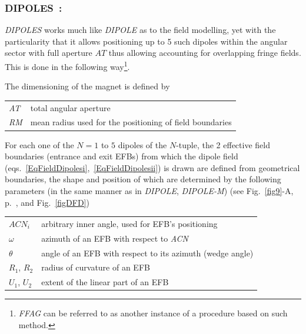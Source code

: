 \newpage

\subsubsection*{DIPOLES~: \DIPOLESTitl~\cite{reportNIMFFAG,reportICFAFFAG}} \label{DIPOLES} 
\medskip

\noindent \textsl{DIPOLES} works much like \textsl{DIPOLE} 
as to the field modelling, yet with the particularity that it allows positioning up to 5 such 
dipoles within the angular sector with full aperture $AT$ thus allowing 
accounting for overlapping fringe fields. 
This is done in the following 
way\footnote{\textsl{FFAG} can be referred to as another instance of a procedure based on such method.}. 

\bigskip

\noindent  The dimensioning of the magnet is defined by

\bigskip

 \begin{tabular}{>{\sl}l!{~:}l}
	 AT &  total angular aperture \\
	 RM & mean radius used for the positioning of field boundaries\\
 \end{tabular}

\bigskip

\noindent For each one of the $N=1$ to $5$ dipoles of the  $N$-tuple, 
the 2 effective field boundaries (entrance and exit EFBs) from which  the dipole field  
 (eqs.~\ref{EqFieldDipolesi},~\ref{EqFieldDipolesii})  is drawn are
defined from geometrical  boundaries, the shape and position of which are determined by the 
following parameters (in the same manner as in \textsl{DIPOLE}, \textsl{DIPOLE-M})
 (see Fig.~\ref{fig9}-A, p.~\pageref{fig9}, and Fig.~\ref{figDFD}) 

\bigskip

\begin{tabular}{l!{~:}l}
	$ACN_i$  & arbitrary inner angle, used for EFB's positioning  \\
	$\omega$ &  azimuth of an EFB with respect to  \textsl{ACN}\\
	$\theta$ & angle of an EFB with respect to its azimuth (wedge angle)\\ 
	$R_1$, $R_2$  &  radius of curvature of an EFB\\
	$U_1$, $U_2$  &  extent of the linear part of an EFB  \\
\end{tabular}

